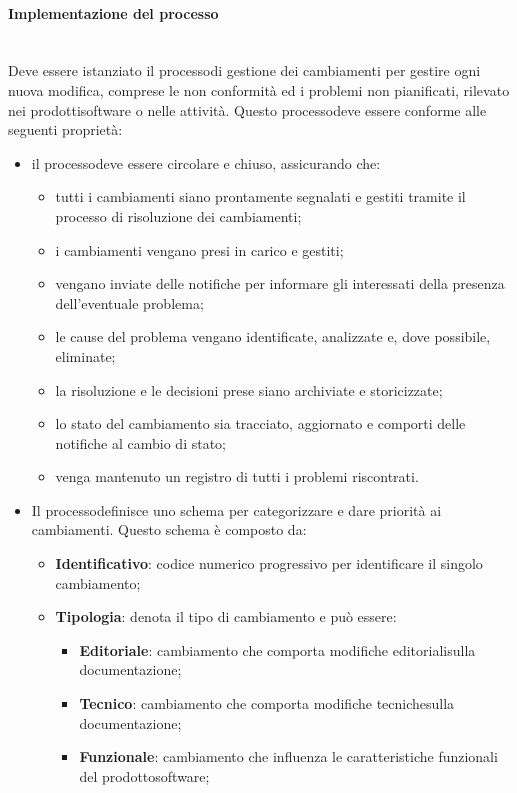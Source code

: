 \paragraph{Implementazione del processo}\mbox{}\\ [1mm]
Deve essere istanziato il processo\glosp di gestione dei cambiamenti per gestire ogni nuova modifica, comprese le non conformità ed i problemi non pianificati, rilevato nei prodotti\glosp software o nelle attività. Questo processo\glosp deve essere conforme alle seguenti proprietà:
\begin{itemize}
	\item il processo\glosp deve essere circolare e chiuso, assicurando che:
	\begin{itemize} 
		\item tutti i cambiamenti siano prontamente segnalati e gestiti tramite il processo di risoluzione dei cambiamenti;
		\item i cambiamenti vengano presi in carico e gestiti;
		\item vengano inviate delle notifiche per informare gli interessati della presenza dell'eventuale problema;
		\item le cause del problema vengano identificate, analizzate e, dove possibile, eliminate;
		\item la risoluzione e le decisioni prese siano archiviate e storicizzate;
		\item lo stato del cambiamento sia tracciato, aggiornato e comporti delle notifiche al cambio di stato;
		\item venga mantenuto un registro di tutti i problemi riscontrati.
	\end{itemize}
	\item Il processo\glosp definisce uno schema per categorizzare e dare priorità ai cambiamenti. Questo schema è composto da:
	\begin{itemize} 
		\item \textbf{Identificativo}: codice numerico progressivo per identificare il singolo cambiamento;
		\item \textbf{Tipologia}: denota il tipo di cambiamento e può essere:
		\begin{itemize}
			\item \textbf{Editoriale}: cambiamento che comporta modifiche editoriali\glosp sulla documentazione;
			\item \textbf{Tecnico}: cambiamento che comporta modifiche tecniche\glosp sulla documentazione;
			\item \textbf{Funzionale}: cambiamento che influenza le caratteristiche funzionali del prodotto\glosp software;

\end{itemize}
\end{itemize}
\end{itemize}
